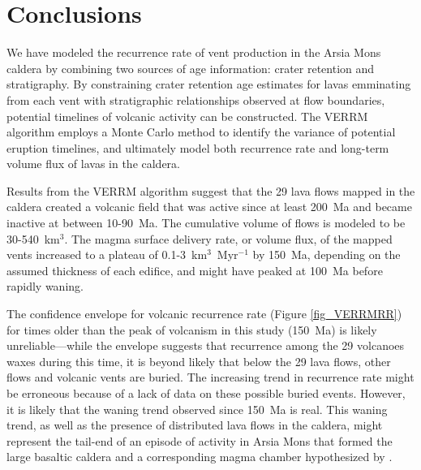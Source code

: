 \section{Conclusions}

We have modeled the recurrence rate of vent production in the Arsia Mons caldera by combining two sources of age information: crater retention and stratigraphy. By constraining crater retention age estimates for lavas emminating from each vent with stratigraphic relationships observed at flow boundaries, potential timelines of volcanic activity can be constructed. The VERRM algorithm employs a Monte Carlo method to identify the variance of potential eruption timelines, and ultimately model both recurrence rate and long-term volume flux of lavas in the caldera.

Results from the VERRM algorithm suggest that the 29 lava flows mapped in the caldera created a volcanic field that was active since at least 200~Ma and became inactive at between 10-90~Ma. The cumulative volume of flows is modeled to be 30-540~km$^3$. The magma surface delivery rate, or volume flux, of the mapped vents increased to a plateau of 0.1-3~km$^3$~Myr$^{-1}$ by 150~Ma, depending on the assumed thickness of each edifice, and might have peaked at 100~Ma before rapidly waning.

The confidence envelope for volcanic recurrence rate (Figure \ref{fig_VERRMRR}) for times older than the peak of volcanism in this study (150~Ma) is likely unreliable---while the envelope suggests that recurrence among the 29 volcanoes waxes during this time, it is beyond likely that below the 29 lava flows, other flows and volcanic vents are buried. The increasing trend in recurrence rate might be erroneous because of a lack of data on these possible buried events. However, it is likely that the waning trend observed since 150~Ma is real. This waning trend, as well as the presence of distributed lava flows in the caldera, might represent the tail-end of an episode of activity in Arsia Mons that formed the large basaltic caldera and a corresponding magma chamber hypothesized by \citet{wilson2001evidence}. 










